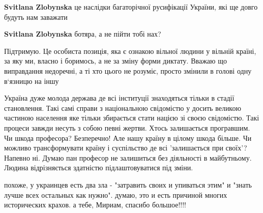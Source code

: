 \begin{itemize}
\begin{itemize}
 
\textbf{Svitlana Zlobynska} це наслідки багаторічної русифікації України, які ще довго будуть нам заважати

 
\textbf{Svitlana Zlobynska} ботяра, а не пійти тобі нах?
\end{itemize}

 

Підтримую. Це особиста позиція, яка є ознакою вільної людини у вільній країні, за яку ми, власно і боримось, а не за зміну форми диктату. Вважаю що виправдання недоречні, а ті хто цього не розуміє, просто змінили в голові одну в‘язницю на іншу


 

Україна дуже молода держава де всі інституції знаходяться тільки в стадії
становлення. Такі самі справи з національною свідомістю у досить великою
частиною населення яке тільки збирається стати нацією зі своєю свідомістю. Такі
процеси завжди несуть з собою певні жертви. Хтось залишається програвшим. Чи
шкода професора? Безперечно! Але нашу країну в цілому шкода більше. Чи можливо
трансформувати країну і суспільство де всі 'залишається при своїх'? Напевно ні.
Думаю пан професор не залишиться без діяльності в майбутньому. Людина
відрізняється здатністю підлаштовуватися під зміни.


похоже, у украинцев есть два зла - "затравить своих и упиваться этим" и "знать
лучше всех остальных как нужно". думаю, это и есть причиной многих исторических
крахов. а тебе, Мириам, спасибо большое!!!!


\end{itemize}
